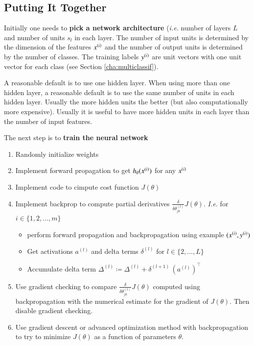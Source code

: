 \documentclass[a4paper,twoside,10pt]{article}
\begin{document}
\subsection{Putting It Together}
Initially one needs to \textbf{pick a network architecture} (\emph{i.e.} number of layers $L$ and number of units $s_l$ in each layer.
The number of input units is determined by the dimension of the features $x^{(i)}$ and the number of output units is determined by the number of classes.
The training labels $y^{(i)}$ are unit vectors with one unit vector for each class (see Section \ref{cha:multiclassif}).

A reasonable default is to use one hidden layer.
When using more than one hidden layer, a reasonable default is to use the same number of units in each hidden layer.
Usually the more hidden units the better (but also computationally more expensive).
Usually it is useful to have more hidden units in each layer than the number of input features.

The next step is to \textbf{train the neural network}
\begin{enumerate}
  \item Randomly initialize weights
  \item Implement forward propagation to get $h_\theta(x^{(i)})$ for any $x^{(i)}$
  \item Implement code to cimpute cost function $J(\theta)$
  \item Implement backprop to compute partial derivatives $\frac{\delta}{\delta\theta^{(l)}_{jk}}J(\theta)$.
    \emph{I.e.} for $i\in\{1,2,\ldots,m\}$
    \begin{itemize}
      \item perform forward propagation and backpropagation using example $(x^{(i)},y^{(i)})$
      \item Get activations $a^{(l)}$ and delta terms $\delta^{(l)}$ for $l\in\{2,\ldots,L\}$
      \item Accumulate delta term $\Delta^{(l)}\coloneqq\Delta^{(l)}+\delta^{(l+1)}\,(a^{(l)})^\top$
    \end{itemize}
  \item Use gradient checking to compare $\frac{\delta}{\delta\theta^{(l)}_{jk}}J(\theta)$ computed using backpropagation with the numerical estimate for the gradient of $J(\theta)$. Then disable gradient checking.
  \item Use gradient descent or advanced optimization method with backpropagation to try to minimize $J(\theta)$ as a function of parameters $\theta$.
\end{enumerate}
\end{document}
